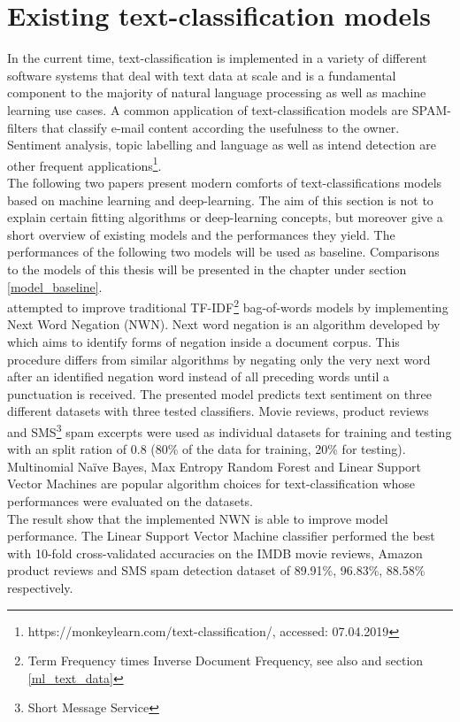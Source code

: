 \section{Existing text-classification models}\label{existing_text_class_models}
In the current time, text-classification is implemented in a variety of different software systems that deal with text data at scale and is a fundamental component to the majority of natural language processing as well as machine learning use cases. A common application of text-classification models are SPAM-filters that classify e-mail content according the usefulness to the owner. Sentiment analysis, topic labelling and language as well as intend detection are other frequent applications\footnote{https://monkeylearn.com/text-classification/, accessed: 07.04.2019}.\\
The following two papers present modern comforts of text-classifications models based on machine learning and deep-learning. The aim of this section is not to explain certain fitting algorithms or deep-learning concepts, but moreover give a short overview of existing models and the performances they yield. The performances of the following two models will be used as baseline. Comparisons to the models of this thesis will be presented in the  chapter under section \ref{model_baseline}. \\

\textcite{Das2018} attempted to improve traditional TF-IDF\footnote{Term Frequency times Inverse Document Frequency, see also  and section \ref{ml_text_data}} bag-of-words models by implementing Next Word Negation (NWN). Next word negation is an algorithm developed by \textcite{Das2018} which aims to identify forms of negation inside a document corpus. This procedure differs from similar algorithms by negating only the very next word after an identified negation word instead of all preceding words until a punctuation is received. The presented model predicts text sentiment on three different datasets with three tested classifiers. Movie reviews, product reviews and SMS\footnote{Short Message Service} spam excerpts were used as individual datasets for training and testing with an split ration of 0.8 (80\% of the data for training, 20\%  for testing). Multinomial Na\"ive Bayes, Max Entropy Random Forest and Linear Support Vector Machines are popular algorithm choices for text-classification whose performances were evaluated on the datasets. \\
The result show that the implemented NWN is able to improve model performance. The Linear Support Vector Machine classifier performed the best with 10-fold cross-validated accuracies on the IMDB movie reviews, Amazon product reviews and SMS spam detection dataset of 89.91\%, 96.83\%, 88.58\% respectively. \\


